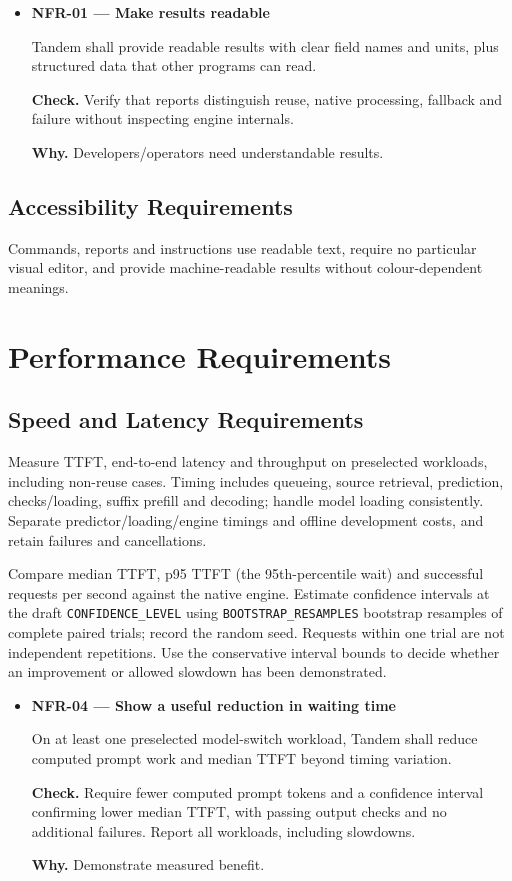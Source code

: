 \documentclass[12pt]{article}
\begin{document}
\begin{itemize}
\item {}\label{req:NFR-01}
\textbf{NFR-01 --- Make results readable}\par
Tandem shall provide readable results with clear field names and units, plus structured data that other programs can read.\par
\textbf{Check.} Verify that reports distinguish reuse, native processing, fallback and failure without inspecting engine internals.\par
\textbf{Why.} Developers/operators need understandable results.
\end{itemize}


\subsection{Accessibility Requirements}
Commands, reports and instructions use readable text, require no particular
visual editor, and provide machine-readable results without colour-dependent meanings.


\section{Performance Requirements}


\subsection{Speed and Latency Requirements}
\label{sec:performance}
Measure TTFT, end-to-end latency and throughput on preselected workloads,
including non-reuse cases. Timing includes queueing, source retrieval,
prediction, checks/loading, suffix prefill and decoding; handle model loading
consistently. Separate predictor/loading/engine timings and offline development
costs, and retain failures and cancellations.

Compare median TTFT, p95 TTFT (the 95th-percentile wait) and successful
requests per second against the native engine. Estimate confidence
intervals at the draft \texttt{CONFIDENCE\_LEVEL} using
\texttt{BOOTSTRAP\_RESAMPLES} bootstrap resamples
of complete paired trials; record the random seed. Requests within one trial are not independent
repetitions. Use the conservative interval bounds to decide whether an
improvement or allowed slowdown has been demonstrated.

\begin{itemize}
\item {}\label{req:NFR-04}
\textbf{NFR-04 --- Show a useful reduction in waiting time}\par
On at least one preselected model-switch workload, Tandem shall reduce computed prompt work and median TTFT beyond timing variation.\par
\textbf{Check.} Require fewer computed prompt tokens and a confidence interval confirming lower median TTFT, with passing output checks and no additional failures. Report all workloads, including slowdowns.\par
\textbf{Why.} Demonstrate measured benefit.
\end{itemize}
\end{document}
